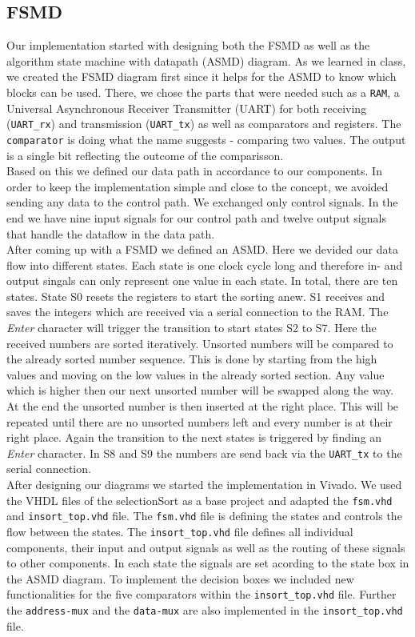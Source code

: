 \documentclass[conference]{IEEEtran}
\begin{document}
\subsection{FSMD}\label{section:fsmd}
Our implementation started with designing both the FSMD as well as the algorithm state machine with datapath (ASMD) diagram. As we learned in class, we created the FSMD diagram first since it helps for the ASMD to know which blocks can be used. There, we chose the parts that were needed such as a \texttt{RAM}, a Universal Asynchronous Receiver Transmitter (UART) for both receiving (\texttt{UART\_rx}) and transmission (\texttt{UART\_tx}) as well as comparators and registers. The \texttt{comparator} is doing what the name suggests - comparing two values. The output is a single bit reflecting the outcome of the comparisson. \\ 
Based on this we defined our data path in accordance to our components. In order to keep the implementation simple and close to the concept, we avoided sending any data to the control path. We exchanged only control signals. In the end we have nine input signals for our control path and twelve output signals that handle the dataflow in the data path.\\
After coming up with a FSMD we defined an ASMD. Here we devided our data flow into different states. Each state is one clock cycle long and therefore in- and output singals can only represent one value in each state. In total, there are ten states. State S0 resets the registers to start the sorting anew. S1 receives and saves the integers which are received via a serial connection to the RAM. The \textit{Enter} character will trigger the transition to start states S2 to S7. Here the received numbers are sorted iteratively. Unsorted numbers will be compared to the already sorted number sequence. This is done by starting from the high values and moving on the low values in the already sorted section. Any value which is higher then our next unsorted number will be swapped along the way. At the end the unsorted number is then inserted at the right place. This will be repeated until there are no unsorted numbers left and every number is at their right place. Again the transition to the next states is triggered by finding an \textit{Enter} character. In S8 and S9 the numbers are send back via the \texttt{UART\_tx} to the serial connection. \\
After designing our diagrams we started the implementation in Vivado. We used the VHDL files of the selectionSort as a base project and adapted the \texttt{fsm.vhd} and \texttt{insort\_top.vhd} file. The \texttt{fsm.vhd} file is defining the states and controls the flow between the states. The \texttt{insort\_top.vhd} file defines all individual components, their input and output signals as well as the routing of these signals to other components. In each state the signals are set acording to the state box in the ASMD diagram. To implement the decision boxes we included new functionalities for the five comparators within the \texttt{insort\_top.vhd} file. Further the \texttt{address-mux} and the \texttt{data-mux} are also implemented in the \texttt{insort\_top.vhd} file.\\
\end{document}
